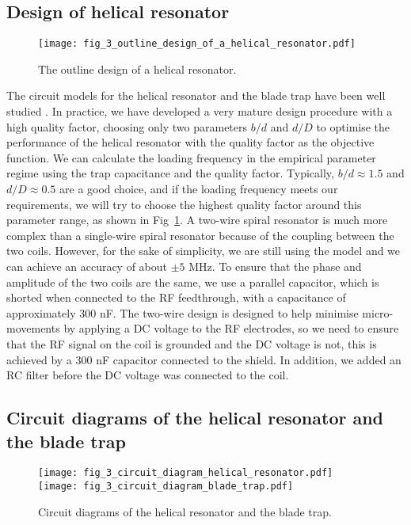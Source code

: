 \subsection{Design of helical resonator}

\begin{figure}
    \centering
    \texttt{[image: fig\_3\_outline\_design\_of\_a\_helical\_resonator.pdf]}
    \caption{The outline design of a helical resonator.}
    \label{fig:outline_design_of_a_helical_resonator}
\end{figure}

The circuit models for the helical resonator and the blade trap have been well studied \cite{RN264,RN91,RN288}. In practice, we have developed a very mature design procedure with a high quality factor, choosing only two parameters $ b / d $ and $ d / D $ to optimise the performance of the helical resonator with the quality factor as the objective function. We can calculate the loading frequency in the empirical parameter regime using the trap capacitance and the quality factor. Typically, $ b / d \approx 1.5 $ and $ d / D \approx 0.5 $ are a good choice, and if the loading frequency meets our requirements, we will try to choose the highest quality factor around this parameter range, as shown in Fig~\ref{fig:outline_design_of_a_helical_resonator}. A two-wire spiral resonator is much more complex than a single-wire spiral resonator because of the coupling between the two coils. However, for the sake of simplicity, we are still using the model and we can achieve an accuracy of about $\pm 5$ MHz. To ensure that the phase and amplitude of the two coils are the same, we use a parallel capacitor, which is shorted when connected to the RF feedthrough, with a capacitance of approximately 300 nF. The two-wire design is designed to help minimise micro-movements by applying a DC voltage to the RF electrodes, so we need to ensure that the RF signal on the coil is grounded and the DC voltage is not, this is achieved by a 300 nF capacitor connected to the shield. In addition, we added an RC filter before the DC voltage was connected to the coil.

\subsection{Circuit diagrams of the helical resonator and the blade trap}

\begin{figure}
    \centering
    {\texttt{[image: fig\_3\_circuit\_diagram\_helical\_resonator.pdf]}}
    {\texttt{[image: fig\_3\_circuit\_diagram\_blade\_trap.pdf]}}
    \caption{Circuit diagrams of the helical resonator and the blade trap.}
    \label{fig:circuit_diagram}
\end{figure}

